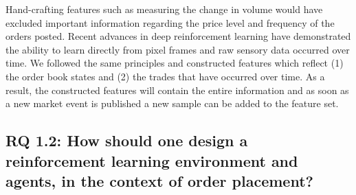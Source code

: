 Hand-crafting features such as measuring the change in volume would have excluded important information regarding the price level and frequency of the orders posted.
Recent advances in deep reinforcement learning have demonstrated the ability to learn directly from pixel frames\cite{mnih2013playing} and raw sensory data\cite{mnih2015human} occurred over time.
We followed the same principles and constructed features which reflect (1) the order book states and (2) the trades that have occurred over time.
As a result, the constructed features will contain the entire information and as soon as a new market event is published a new sample can be added to the feature set.


\subsection{RQ 1.2: How should one design a reinforcement learning environment and agents, in the context of order placement?}

